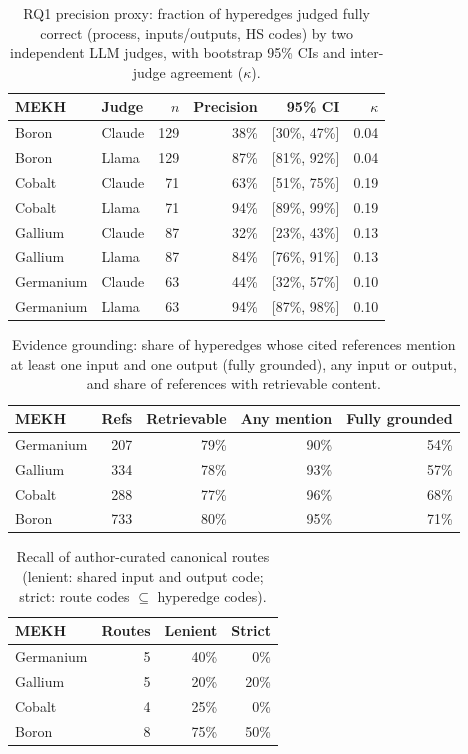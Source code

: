 \begin{table}[t]\centering\small
\caption{RQ1 precision proxy: fraction of hyperedges judged fully correct (process, inputs/outputs, HS codes) by two independent LLM judges, with bootstrap 95\% CIs and inter-judge agreement ($\kappa$).}
\label{tab:judge}
\begin{tabular}{llrrrr}\toprule
MEKH & Judge & $n$ & Precision & 95\% CI & $\kappa$ \\\midrule
Boron & Claude & 129 & 38\% & [30\%, 47\%] & 0.04 \\
Boron & Llama & 129 & 87\% & [81\%, 92\%] & 0.04 \\
Cobalt & Claude & 71 & 63\% & [51\%, 75\%] & 0.19 \\
Cobalt & Llama & 71 & 94\% & [89\%, 99\%] & 0.19 \\
Gallium & Claude & 87 & 32\% & [23\%, 43\%] & 0.13 \\
Gallium & Llama & 87 & 84\% & [76\%, 91\%] & 0.13 \\
Germanium & Claude & 63 & 44\% & [32\%, 57\%] & 0.10 \\
Germanium & Llama & 63 & 94\% & [87\%, 98\%] & 0.10 \\
\bottomrule\end{tabular}\end{table}

\begin{table}[t]\centering\small
\caption{Evidence grounding: share of hyperedges whose cited references mention at least one input and one output (fully grounded), any input or output, and share of references with retrievable content.}
\label{tab:evidence}
\begin{tabular}{lrrrr}\toprule
MEKH & Refs & Retrievable & Any mention & Fully grounded \\\midrule
Germanium & 207 & 79\% & 90\% & 54\% \\
Gallium & 334 & 78\% & 93\% & 57\% \\
Cobalt & 288 & 77\% & 96\% & 68\% \\
Boron & 733 & 80\% & 95\% & 71\% \\
\bottomrule\end{tabular}\end{table}

\begin{table}[t]\centering\small
\caption{Recall of author-curated canonical routes (lenient: shared input and output code; strict: route codes $\subseteq$ hyperedge codes).}
\label{tab:recall}
\begin{tabular}{lrrr}\toprule
MEKH & Routes & Lenient & Strict \\\midrule
Germanium & 5 & 40\% & 0\% \\
Gallium & 5 & 20\% & 20\% \\
Cobalt & 4 & 25\% & 0\% \\
Boron & 8 & 75\% & 50\% \\
\bottomrule\end{tabular}\end{table}

